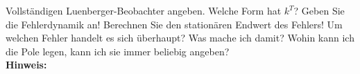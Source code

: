 \begin{question}[section=8,name={Luenberger Beobachter},difficulty=,type=mdl,tags={}]
	Vollständigen Luenberger-Beobachter angeben. Welche Form hat $k^T$? Geben Sie die Fehlerdynamik an! Berechnen Sie den stationären Endwert des Fehlers! Um welchen Fehler handelt es sich überhaupt? Was mache ich damit? Wohin kann ich die Pole legen, kann ich sie immer beliebig angeben?
	\\ \textbf{Hinweis:}\\
	
\end{question}
\begin{solution}
	
\end{solution}